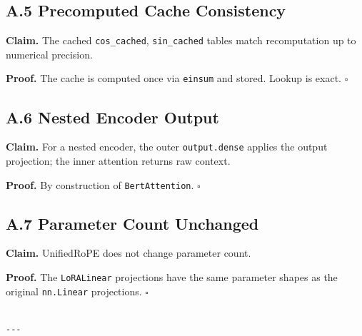 \subsection{A.5 Precomputed Cache Consistency}

\textbf{Claim.} The cached \texttt{cos\_cached}, \texttt{sin\_cached} tables match recomputation 
up to numerical precision.

\textbf{Proof.} The cache is computed once via \texttt{einsum} and stored. Lookup is 
exact. $\square$

\subsection{A.6 Nested Encoder Output}

\textbf{Claim.} For a nested encoder, the outer \texttt{output.dense} applies the 
output projection; the inner attention returns raw context.

\textbf{Proof.} By construction of \texttt{BertAttention}. $\square$

\subsection{A.7 Parameter Count Unchanged}

\textbf{Claim.} UnifiedRoPE does not change parameter count.

\textbf{Proof.} The \texttt{LoRALinear} projections have the same parameter shapes as 
the original \texttt{nn.Linear} projections. $\square$
\begin{lstlisting}

---
\end{lstlisting}
